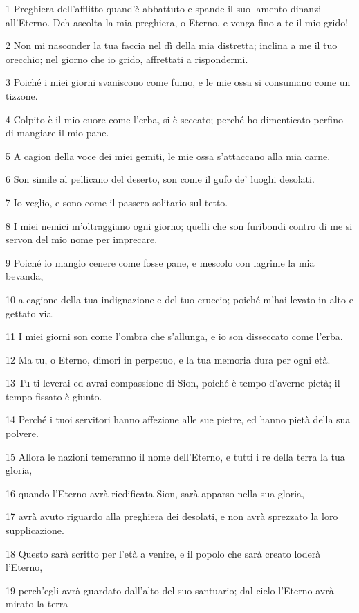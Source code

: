 \par 1 Preghiera dell'afflitto quand'è abbattuto e spande il suo lamento dinanzi all'Eterno. Deh ascolta la mia preghiera, o Eterno, e venga fino a te il mio grido!
\par 2 Non mi nasconder la tua faccia nel dì della mia distretta; inclina a me il tuo orecchio; nel giorno che io grido, affrettati a rispondermi.
\par 3 Poiché i miei giorni svaniscono come fumo, e le mie ossa si consumano come un tizzone.
\par 4 Colpito è il mio cuore come l'erba, si è seccato; perché ho dimenticato perfino di mangiare il mio pane.
\par 5 A cagion della voce dei miei gemiti, le mie ossa s'attaccano alla mia carne.
\par 6 Son simile al pellicano del deserto, son come il gufo de' luoghi desolati.
\par 7 Io veglio, e sono come il passero solitario sul tetto.
\par 8 I miei nemici m'oltraggiano ogni giorno; quelli che son furibondi contro di me si servon del mio nome per imprecare.
\par 9 Poiché io mangio cenere come fosse pane, e mescolo con lagrime la mia bevanda,
\par 10 a cagione della tua indignazione e del tuo cruccio; poiché m'hai levato in alto e gettato via.
\par 11 I miei giorni son come l'ombra che s'allunga, e io son disseccato come l'erba.
\par 12 Ma tu, o Eterno, dimori in perpetuo, e la tua memoria dura per ogni età.
\par 13 Tu ti leverai ed avrai compassione di Sion, poiché è tempo d'averne pietà; il tempo fissato è giunto.
\par 14 Perché i tuoi servitori hanno affezione alle sue pietre, ed hanno pietà della sua polvere.
\par 15 Allora le nazioni temeranno il nome dell'Eterno, e tutti i re della terra la tua gloria,
\par 16 quando l'Eterno avrà riedificata Sion, sarà apparso nella sua gloria,
\par 17 avrà avuto riguardo alla preghiera dei desolati, e non avrà sprezzato la loro supplicazione.
\par 18 Questo sarà scritto per l'età a venire, e il popolo che sarà creato loderà l'Eterno,
\par 19 perch'egli avrà guardato dall'alto del suo santuario; dal cielo l'Eterno avrà mirato la terra
